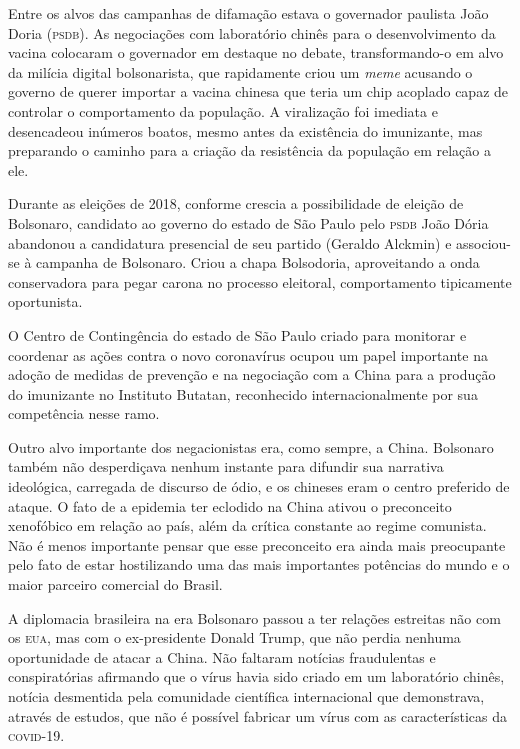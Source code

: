 Entre os alvos das campanhas de difamação estava o governador paulista
João Doria (\textsc{psdb}). As negociações com laboratório chinês para o
desenvolvimento da vacina colocaram o governador em destaque no debate,
transformando-o em alvo da milícia digital bolsonarista, que rapidamente
criou um \textit{meme} acusando o governo de querer importar a vacina chinesa que
teria um chip acoplado capaz de controlar o comportamento da população.
A viralização foi imediata e desencadeou inúmeros boatos, mesmo antes da
existência do imunizante, mas preparando o caminho para a criação da
resistência da população em relação a ele.

Durante as eleições de 2018, conforme crescia a possibilidade de eleição
de Bolsonaro, candidato ao governo do estado de São Paulo pelo \textsc{psdb} João
Dória abandonou a candidatura presencial de seu partido (Geraldo
Alckmin) e associou-se à campanha de Bolsonaro. Criou a chapa
Bolsodoria, aproveitando a onda conservadora para pegar carona no
processo eleitoral, comportamento tipicamente oportunista.

O Centro de Contingência do estado de São Paulo criado para monitorar e
coordenar as ações contra o novo coronavírus ocupou um papel importante
na adoção de medidas de prevenção e na negociação com a China para a
produção do imunizante no Instituto Butatan, reconhecido
internacionalmente por sua competência nesse ramo.

Outro alvo importante dos negacionistas era, como sempre, a China.
Bolsonaro também não desperdiçava nenhum instante para difundir sua
narrativa ideológica, carregada de discurso de ódio, e os chineses eram
o centro preferido de ataque. O fato de a epidemia ter eclodido na China
ativou o preconceito xenofóbico em relação ao país, além da crítica
constante ao regime comunista. Não é menos importante pensar que esse
preconceito era ainda mais preocupante pelo fato de estar hostilizando
uma das mais importantes potências do mundo e o maior parceiro comercial
do Brasil.

A diplomacia brasileira na era Bolsonaro passou a ter relações estreitas
não com os \textsc{eua}, mas com o ex-presidente Donald Trump, que não perdia
nenhuma oportunidade de atacar a China. Não faltaram notícias
fraudulentas e conspiratórias afirmando que o vírus havia sido criado em
um laboratório chinês, notícia desmentida pela comunidade científica
internacional que demonstrava, através de estudos, que não é possível
fabricar um vírus com as características da \textsc{covid-19}.

